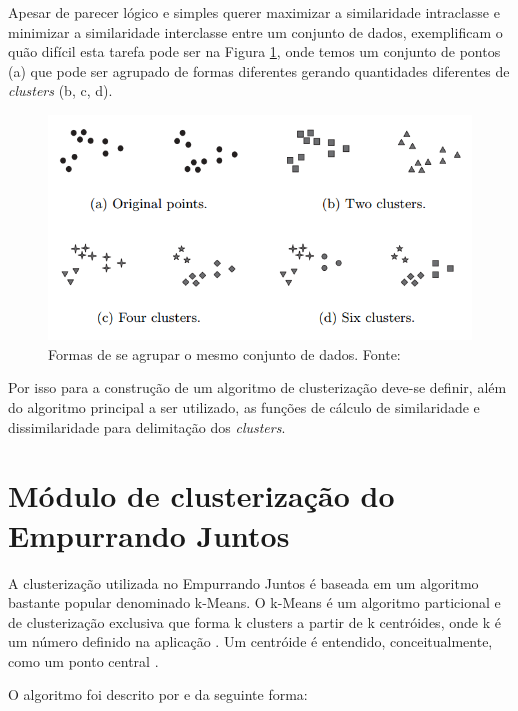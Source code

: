Apesar de parecer lógico e simples querer maximizar a similaridade intraclasse e minimizar a similaridade interclasse entre um conjunto de dados, 
 exemplificam o quão difícil esta tarefa pode ser na Figura \ref{fig:clusters_difficulty}, onde temos um conjunto
de pontos (a) que pode ser agrupado de formas diferentes gerando quantidades diferentes de \textit{clusters} (b, c, d).

\begin{figure}[ht!]
\centering
\includegraphics[scale=0.4]{figuras/clusters_difficulty.png}
\caption{Formas de se agrupar o mesmo conjunto de dados. Fonte: \cite{tan2013data}}
\label{fig:clusters_difficulty}
\end{figure}

Por isso para a construção de um algoritmo de clusterização deve-se definir, além do algoritmo principal a ser utilizado, as funções
de cálculo de similaridade e dissimilaridade para delimitação dos \textit{clusters}.

\vfill
\pagebreak

\section{Módulo de clusterização do Empurrando Juntos}

A clusterização utilizada no Empurrando Juntos é baseada em um algoritmo bastante popular denominado k-Means. O k-Means é um
algoritmo particional e de clusterização exclusiva que forma k clusters a partir de k centróides, onde k é um número definido na aplicação 
\cite{clustering_review, tan2013data}. Um centróide é entendido, conceitualmente, como um ponto central \cite{han2011data}.

O algoritmo foi descrito por  e  da seguinte forma:

